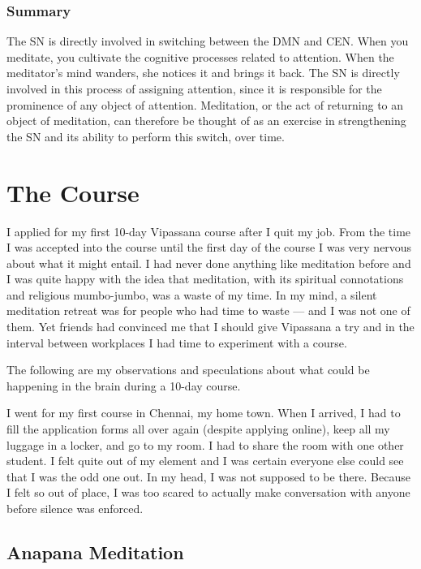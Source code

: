 \documentclass[a4paper, amsfonts, amssymb, amsmath, reprint, showkeys, nofootinbib, twoside]{revtex4-1}
\begin{document}
\subsubsection{Summary}

The SN is directly involved in switching between the DMN and CEN. When you meditate,
you cultivate the cognitive processes related to attention.
When the meditator's mind wanders, she notices it and brings it back.
The SN is directly involved in this process of assigning attention, since it is
responsible for the prominence of any object of attention.
Meditation, or the act of returning to an object of meditation, can therefore be
thought of as an exercise in strengthening the SN and its ability to perform this switch, over time.


\section{The Course}

I applied for my first 10-day Vipassana course after I quit my job. From the time I
was accepted into the course until the first day of the course I was very nervous
about what it might entail. I had never done anything like meditation before
and I was quite happy with the idea that meditation, with its spiritual connotations
and religious mumbo-jumbo, was a waste of my time. In my mind, a silent meditation retreat was
for people who had time to waste --- and I was not one of them. Yet friends had convinced me that I
should give Vipassana a try and in the interval between workplaces I had
time to experiment with a course.

The following are my observations and speculations about what could be happening
in the brain during a 10-day course.

I went for my first course in Chennai, my home town. When I arrived, I had to fill
the application forms all over again (despite applying online), keep all my
luggage in a locker, and go to my room. I had to share the room with one other
student. I felt quite out of my element and I was certain everyone else could see
that I was the odd one out. In my head, I was not supposed to be there. Because I felt
so out of place, I was too scared to actually make conversation with anyone before
silence was enforced.

\subsection{Anapana Meditation}
\end{document}
